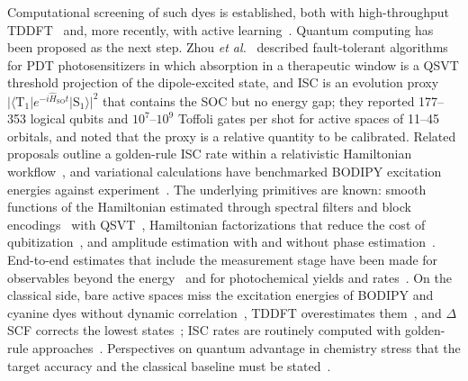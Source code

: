 \documentclass[journal=jctcce,manuscript=article,layout=twocolumn]{achemso}
\newcommand{\Hso}{\hat H_\mathrm{SO}}
\begin{document}
Computational screening of such dyes is established, both with high-throughput TDDFT~\cite{GomezBombarelli2016}
and, more recently, with active learning~\cite{Chen2025,Fallani2026}. Quantum computing has been
proposed as the next step. Zhou \emph{et al.}~\cite{Zhou2026PRA} described fault-tolerant algorithms for
PDT photosensitizers in which absorption in a therapeutic window is a QSVT threshold projection of the
dipole-excited state, and ISC is an evolution proxy $\lvert\langle\mathrm{T}_1\rvert
e^{-i\Hso t}\lvert\mathrm{S}_1\rangle\rvert^2$ that contains the SOC but no energy gap; they reported
177--353 logical qubits and $10^{7}$--$10^{9}$ Toffoli gates per shot for active spaces of 11--45
orbitals, and noted that the proxy is a relative quantity to be calibrated. Related proposals outline a golden-rule ISC rate within a relativistic Hamiltonian
workflow~\cite{Zak2026}, and variational calculations have benchmarked BODIPY excitation energies
against experiment~\cite{Nykanen2024}. The underlying primitives are known: smooth functions of the
Hamiltonian estimated through spectral filters and block encodings~\cite{Roggero2019,Roggero2020,Rall2020,Lu2021}
with QSVT~\cite{Gilyen2019,Martyn2021,Low2019}, Hamiltonian factorizations that reduce the cost of
qubitization~\cite{Babbush2018,Berry2019,vonBurg2021,Lee2021,Loaiza2023BLISS,Rocca2024,Caesura2025}, and
amplitude estimation with and without phase
estimation~\cite{Brassard2002,Suzuki2020,Grinko2021,AaronsonRall2020,GiurgicaTiron2022,RallFuller2023,KnillOrtizSomma2007,Montanaro2015}.
End-to-end estimates that include the measurement stage have been made for observables beyond the
energy~\cite{Steudtner2023,Apel2025} and for photochemical yields and rates~\cite{Eklund2026}. On the
classical side, bare active spaces miss the excitation energies of BODIPY and cyanine dyes without
dynamic correlation~\cite{Momeni2015,Chibani2013,BerraudPache2020}, TDDFT overestimates
them~\cite{Jacquemin2012,LeGuennic2015}, and $\Delta$SCF corrects the lowest
states~\cite{Kowalczyk2011,Hait2021}; ISC rates are routinely computed with golden-rule
approaches~\cite{Etinski2011,Baryshnikov2017,deSouza2019,Shi2022}. Perspectives on quantum advantage in
chemistry stress that the target accuracy and the classical baseline must be
stated~\cite{Babbush2021,LeeS2023,Chan2024,Liu2022}.
\end{document}
